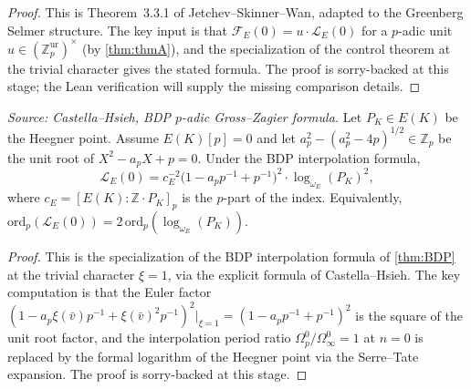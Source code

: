 \begin{proof}
  This is Theorem~3.3.1 of Jetchev--Skinner--Wan, adapted to the Greenberg Selmer structure. The key input is that \(\mathcal{F}_E(0) = u \cdot \mathcal{L}_E(0)\) for a \(p\)-adic unit \(u \in (\mathbb{Z}_p^{\mathrm{ur}})^\times\) (by \cref{thm:thmA}), and the specialization of the control theorem at the trivial character gives the stated formula. The proof is sorry-backed at this stage; the Lean verification will supply the missing comparison details.
\end{proof}

\begin{theorem}
  \label{thm:padic-gz}
  \textit{Source: Castella--Hsieh, BDP \(p\)-adic Gross--Zagier formula.}
  Let \(P_K \in E(K)\) be the Heegner point. Assume \(E(K)[p] = 0\) and let \(a_p^2 - (a_p^2 - 4p)^{1/2} \in \mathbb{Z}_p\) be the unit root of \(X^2 - a_p X + p = 0\). Under the BDP interpolation formula,
  \[
    \mathcal{L}_E(0) = c_E^{-2}\bigl(1 - a_p p^{-1} + p^{-1}\bigr)^2 \cdot \log_{\omega_E}(P_K)^2,
  \]
  where \(c_E = [E(K) : \mathbb{Z} \cdot P_K]_p\) is the \(p\)-part of the index. Equivalently, \(\mathrm{ord}_p(\mathcal{L}_E(0)) = 2\,\mathrm{ord}_p(\log_{\omega_E}(P_K))\).
\end{theorem}

\begin{proof}
  This is the specialization of the BDP interpolation formula of \cref{thm:BDP} at the trivial character \(\xi = 1\), via the explicit formula of Castella--Hsieh. The key computation is that the Euler factor \((1 - a_p\xi(\bar{v})p^{-1} + \xi(\bar{v})^2 p^{-1})^2|_{\xi=1} = (1 - a_p p^{-1} + p^{-1})^2\) is the square of the unit root factor, and the interpolation period ratio \(\Omega_p^0 / \Omega_\infty^0 = 1\) at \(n = 0\) is replaced by the formal logarithm of the Heegner point via the Serre--Tate expansion. The proof is sorry-backed at this stage.
\end{proof}

